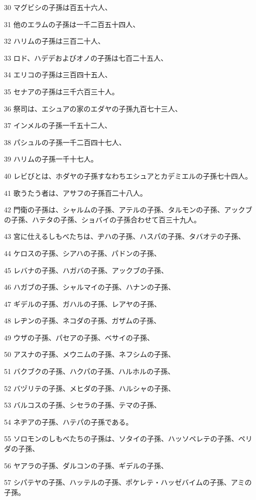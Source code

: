 \par 30 マグビシの子孫は百五十六人、
\par 31 他のエラムの子孫は一千二百五十四人、
\par 32 ハリムの子孫は三百二十人、
\par 33 ロド、ハデデおよびオノの子孫は七百二十五人、
\par 34 エリコの子孫は三百四十五人、
\par 35 セナアの子孫は三千六百三十人。
\par 36 祭司は、エシュアの家のエダヤの子孫九百七十三人、
\par 37 インメルの子孫一千五十二人、
\par 38 パシュルの子孫一千二百四十七人、
\par 39 ハリムの子孫一千十七人。
\par 40 レビびとは、ホダヤの子孫すなわちエシュアとカデミエルの子孫七十四人。
\par 41 歌うたう者は、アサフの子孫百二十八人。
\par 42 門衛の子孫は、シャルムの子孫、アテルの子孫、タルモンの子孫、アックブの子孫、ハテタの子孫、ショバイの子孫合わせて百三十九人。
\par 43 宮に仕えるしもべたちは、ヂハの子孫、ハスパの子孫、タバオテの子孫、
\par 44 ケロスの子孫、シアハの子孫、パドンの子孫、
\par 45 レバナの子孫、ハガバの子孫、アックブの子孫、
\par 46 ハガブの子孫、シャルマイの子孫、ハナンの子孫、
\par 47 ギデルの子孫、ガハルの子孫、レアヤの子孫、
\par 48 レヂンの子孫、ネコダの子孫、ガザムの子孫、
\par 49 ウザの子孫、パセアの子孫、ベサイの子孫、
\par 50 アスナの子孫、メウニムの子孫、ネフシムの子孫、
\par 51 バクブクの子孫、ハクパの子孫、ハルホルの子孫、
\par 52 バヅリテの子孫、メヒダの子孫、ハルシャの子孫、
\par 53 バルコスの子孫、シセラの子孫、テマの子孫、
\par 54 ネヂアの子孫、ハテパの子孫である。
\par 55 ソロモンのしもべたちの子孫は、ソタイの子孫、ハッソペレテの子孫、ペリダの子孫、
\par 56 ヤアラの子孫、ダルコンの子孫、ギデルの子孫、
\par 57 シパテヤの子孫、ハッテルの子孫、ポケレテ・ハッゼバイムの子孫、アミの子孫。
